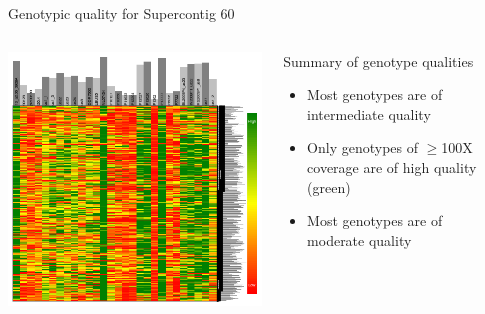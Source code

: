 \documentclass[final,t]{beamer}
\begin{document}
\begin{frame}{}
\begin{columns}[t]
\begin{column}{.4\linewidth}

      \begin{block}{Genotypic quality for Supercontig 60}
        \begin{columns}[t]
          \begin{column}[T]{0.6\linewidth}
            \includegraphics[width=0.9\linewidth, height=0.6\linewidth]{heatmap3.png}
          \end{column}
          \begin{column}[T]{0.4\linewidth}
            Summary of genotype qualities
            \begin{itemize}
              \item Most genotypes are of intermediate quality
              \item Only genotypes of $\geq$100X coverage are of high quality (green)
              \item Most genotypes are of moderate quality
            \end{itemize}
          \end{column}
        \end{columns}
      \end{block}




    \end{column}

    
    \begin{column}{.28\linewidth}


\end{column}
\end{columns}
\end{frame}
\end{document}
